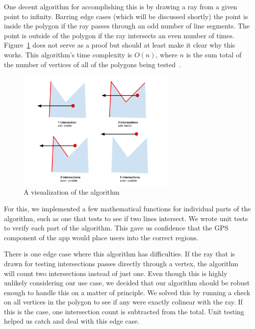 \documentclass[a4paper, 10pt, american, titlepage]{article}
\begin{document}
One decent algorithm for accomplishing this is by drawing a ray from a given
point to infinity. Barring edge cases (which will be discussed shortly) the
point is inside the polygon if the ray passes through an odd number of line
segments.  The point is outside of the polygon if the ray intersects an even
number of times. Figure~\ref{fig:intersectionsDiagram} does not serve as a proof
but should at least make it clear why this works. This algorithm's time
complexity is $O(n)$, where $n$ is the sum total of the number of vertices of
all of the polygons being tested~\autocite{geeksforgeekspolygon}.

\begin{figure}[h]
	\centering
	\includegraphics[width=0.7\textwidth]{intersections-diagram.png}
	\caption{A visualization of the algorithm}
	\label{fig:intersectionsDiagram}
\end{figure}

For this, we implemented a few mathematical functions for individual parts of
the algorithm, such as one that tests to see if two lines intersect. We wrote
unit tests to verify each part of the algorithm. This gave us confidence that
the GPS component of the app would place users into the correct regions.

There is one edge case where this algorithm has difficulties. If the ray that is
drawn for testing intersections passes directly through a vertex, the algorithm
will count two intersections instead of just one. Even though this is highly
unlikely considering our use case, we decided that our algorithm should be
robust enough to handle this on a matter of principle. We solved this by running
a check on all vertices in the polygon to see if any were exactly colinear with
the ray. If this is the case, one intersection count is subtracted from the
total. Unit testing helped us catch and deal with this edge case.
\end{document}

